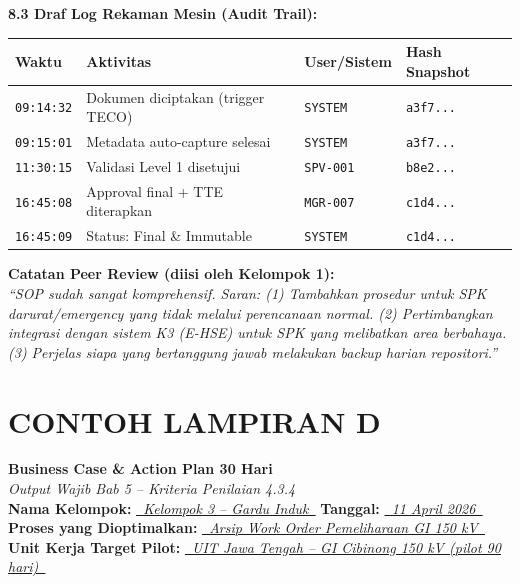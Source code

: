\documentclass[12pt,a4paper]{report}
\begin{document}
\begin{tcolorbox}[colback=fillgreen, colframe=plnblue!50, sharp corners, title={\small\bfseries Komponen 8: Lampiran Teknis (Matriks Metadata, Peta DB, \& Audit Trail)}]
\vspace{0.3cm}
\noindent\textbf{8.3 Draf Log Rekaman Mesin (Audit Trail):}\\
\small
\begin{tabularx}{\textwidth}{@{} l X l X @{}}
\toprule
\textbf{Waktu} & \textbf{Aktivitas} & \textbf{User/Sistem} & \textbf{Hash Snapshot} \\
\midrule
\texttt{09:14:32} & Dokumen diciptakan (trigger TECO) & \texttt{SYSTEM} & \texttt{a3f7...} \\
\texttt{09:15:01} & Metadata auto-capture selesai & \texttt{SYSTEM} & \texttt{a3f7...} \\
\texttt{11:30:15} & Validasi Level 1 disetujui & \texttt{SPV-001} & \texttt{b8e2...} \\
\texttt{16:45:08} & Approval final + TTE diterapkan & \texttt{MGR-007} & \texttt{c1d4...} \\
\texttt{16:45:09} & Status: Final \& Immutable & \texttt{SYSTEM} & \texttt{c1d4...} \\
\bottomrule
\end{tabularx}
\end{tcolorbox}

\vspace{0.3cm}
\noindent\textbf{Catatan Peer Review (diisi oleh Kelompok 1):}\\
\textit{``SOP sudah sangat komprehensif. Saran: (1) Tambahkan prosedur untuk SPK darurat/emergency yang tidak melalui perencanaan normal. (2) Pertimbangkan integrasi dengan sistem K3 (E-HSE) untuk SPK yang melibatkan area berbahaya. (3) Perjelas siapa yang bertanggung jawab melakukan backup harian repositori.''}


\newpage
\section*{\color{plnblue} CONTOH LAMPIRAN D}
{\Large\bfseries Business Case \& Action Plan 30 Hari}\\[0.15cm]
{\normalsize\color{medgray}\textit{Output Wajib Bab 5 -- Kriteria Penilaian 4.3.4}}\\[0.4cm]

\noindent\textbf{Nama Kelompok:} \underline{\textit{~Kelompok 3 -- Gardu Induk~}} \quad \textbf{Tanggal:} \underline{\textit{~11 April 2026~}}\\[0.25cm]
\textbf{Proses yang Dioptimalkan:} \underline{\textit{~Arsip Work Order Pemeliharaan GI 150 kV~}}\\[0.25cm]
\textbf{Unit Kerja Target Pilot:} \underline{\textit{~UIT Jawa Tengah -- GI Cibinong 150 kV (pilot 90 hari)~}}
\end{document}

